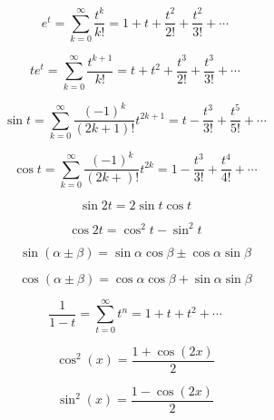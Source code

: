 \documentclass{exam}
\begin{document}
    \begin{minipage}{0.45\linewidth}
        \[
            e^{t} = \sum_{k=0}^{\infty} \frac{t^{k}}{k\mathbf{!}} = 1 + t + \frac{t^2}{2\mathbf{!}} + \frac{t^2}{3\mathbf{!}} + \cdots 
        \]
    \end{minipage}
    \hfill
    \begin{minipage}{0.45\linewidth}
        \[
            te^{t} = \sum_{k=0}^{\infty} \frac{t^{k+1}}{k\mathbf{!}} = t + t^2 + \frac{t^3}{2\mathbf{!}} + \frac{t^3}{3\mathbf{!}} + \cdots 
        \]
    \end{minipage}
    \begin{minipage}{0.45\linewidth}
        \[
            \sin t = \sum_{k=0}^{\infty} \frac{(-1)^{k}}{(2k + 1)\mathbf{!}}t^{2k + 1} = t - \frac{t^3}{3\mathbf{!}} + \frac{t^5}{5\mathbf{!}} + \cdots 
        \]
    \end{minipage}
    \hfill
    \begin{minipage}{0.45\linewidth}
        \[
            \cos t = \sum_{k=0}^{\infty} \frac{(-1)^{k}}{(2k +)\mathbf{!}}t^{2k} = 1 - \frac{t^3}{3\mathbf{!}} + \frac{t^4}{4\mathbf{!}} + \cdots 
        \]
    \end{minipage}
    \begin{minipage}{0.45\linewidth}
        \[
            \sin 2t = 2 \sin t \cos t
        \]
    \end{minipage}
    \hfill
    \begin{minipage}{0.45\linewidth}
        \[
            \cos 2t = \cos^2 t - \sin^2 t
        \]
    \end{minipage}
    \begin{minipage}{0.45\linewidth}
        \[
            \sin(\alpha \pm \beta) = \sin \alpha \cos \beta \pm \cos\alpha \sin\beta
        \]
    \end{minipage}
    \hfill
    \begin{minipage}{0.45\linewidth}
        \[
            \cos(\alpha \pm \beta) = \cos\alpha\cos\beta + \sin\alpha\sin\beta
        \]
    \end{minipage}
    \[
        \frac{1}{1-t} = \sum_{t=0}^{\infty} t^n = 1 + t + t^2 + \cdots 
    \]
    \begin{minipage}{0.45\linewidth}
        \[
            \cos^{2}(x) = \frac{1+\cos(2x)}{2}
        \]
    \end{minipage}
    \hfill
    \begin{minipage}{0.45\linewidth}
        \[
            \sin^{2}(x) = \frac{1-\cos(2x)}{2}
        \]
    \end{minipage}
\end{document}
